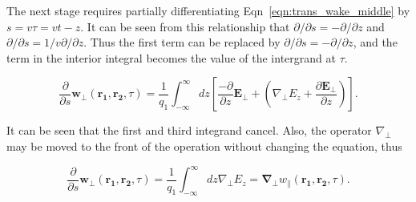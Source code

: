 The next stage requires partially differentiating Eqn~\ref{eqn:trans_wake_middle} by $s = v \tau = vt - z$. It can be seen from this relationship that $\partial / \partial s = - \partial / \partial z$ and $\partial / \partial s = 1/v \partial / \partial z$. Thus the first term can be replaced by $\partial / \partial s = - \partial / \partial z$, and the term in the interior integral becomes the value of the intergrand at $\tau$.

\begin{equation}
\frac{\partial}{\partial s}\mathbf{w}_{\perp} \left(\mathbf{r_{1}}, \mathbf{r_{2}}, \tau   \right) = \frac{1}{q_{1}} \int^{\infty}_{-\infty} dz \left[ \frac{-\partial}{\partial z}\mathbf{E_{\perp}} + \left(  \nabla_{\perp}E_{z} + \frac{\partial\mathbf{E}_{\perp}}{\partial z} \right) \right].
\end{equation} 

It can be seen that the first and third integrand cancel. Also, the operator $\nabla_{\perp}$ may be moved to the front of the operation without changing the equation, thus

\begin{equation}
\frac{\partial}{\partial s}\mathbf{w}_{\perp} \left(\mathbf{r_{1}}, \mathbf{r_{2}}, \tau   \right) =  \frac{1}{q_{1}} \int^{\infty}_{-\infty} dz \nabla_{\perp}E_{z} = \mathbf{\nabla_{\perp}} w_{\parallel}\left( \mathbf{r_{1}}, \mathbf{r_{2}}, \tau   \right).
\end{equation}

